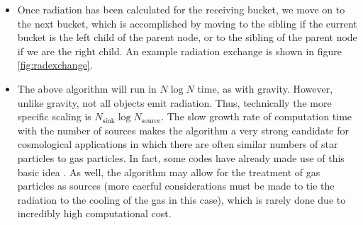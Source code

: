 \begin{itemize}
\begin{enumerate}
	\end{enumerate}
\item Once radiation has been calculated for the receiving bucket, we move on to the next bucket, which is accomplished by moving to the sibling if the current bucket is the left child of the parent node, or to the sibling of the parent node if we are the right child. An example radiation exchange is shown in figure \ref{fig:radexchange}.
\item The above algorithm will run in $N\log{N}$ time, as with gravity. However, unlike gravity, not all objects emit radiation. Thus, technically the more specific scaling is $N_{\mbox{sink}}\log{N_{\mbox{source}}}$. The slow growth rate of computation time with the number of sources makes the algorithm a very strong candidate for cosmological applications in which there are often similar numbers of star particles to gas particles. In fact, some codes have already made use of this basic idea \citep{gnedinAbel99,hopkins, kannanEt14}. As well, the algorithm may allow for the treatment of gas particles as sources (more caerful considerations must be made to tie the radiation to the cooling of the gas in this case), which is rarely done due to incredibly high computational cost.
\end{itemize}

